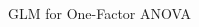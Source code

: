 \documentclass[presentation]{beamer}
\begin{document}
\begin{frame}[label={sec:orga7d2341}]{GLM for One-Factor ANOVA}
\begin{columns}
\begin{column}{.3\columnwidth}

\end{column}
\end{columns}
\end{frame}
\end{document}
